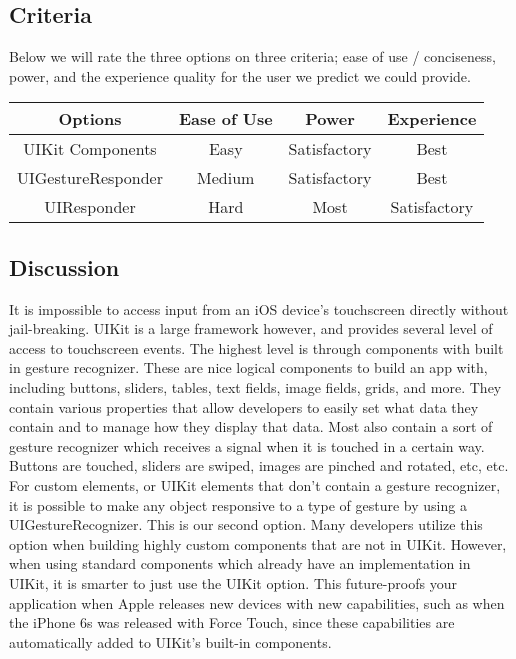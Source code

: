 \documentclass[letterpaper,10pt,titlepage]{article}
\begin{document}
\subsection{Criteria}
Below we will rate the three options on three criteria; ease of use / conciseness, power, and the experience quality for the user we predict we could provide.
\begin{center}
\begin{tabular}{ |c|c|c|c| }
 \hline
 Options & Ease of Use & Power & Experience \\ \hline
 UIKit Components & Easy & Satisfactory & Best \\ \hline
 UIGestureResponder & Medium & Satisfactory & Best \\ \hline
 UIResponder & Hard & Most & Satisfactory \\
 \hline
\end{tabular}
\end{center}

\subsection{Discussion}
It is impossible to access input from an iOS device's touchscreen directly without jail-breaking. UIKit is a large framework however, and provides several level of access to touchscreen events. The highest level is through components with built in gesture recognizer. These are nice logical components to build an app with, including buttons, sliders, tables, text fields, image fields, grids, and more. They contain various properties that allow developers to easily set what data they contain and to manage how they display that data. Most also contain a sort of gesture recognizer which receives a signal when it is touched in a certain way. Buttons are touched, sliders are swiped, images are pinched and rotated, etc, etc.\\

For custom elements, or UIKit elements that don't contain a gesture recognizer, it is possible to make any object responsive to a type of gesture by using a UIGestureRecognizer. This is our second option. Many developers utilize this option when building highly custom components that are not in UIKit. However, when using standard components which already have an implementation in UIKit, it is smarter to just use the UIKit option. This future-proofs your application when Apple releases new devices with new capabilities, such as when the iPhone 6s was released with Force Touch, since these capabilities are automatically added to UIKit's built-in components.
\end{document}
